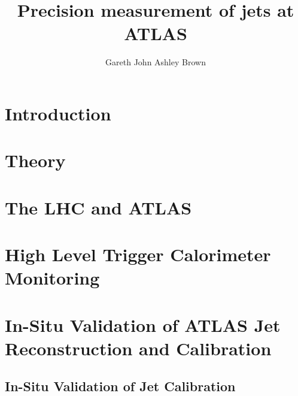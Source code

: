\documentclass[12pt,PhD]{Thesis}
\begin{document}
\title{Precision measurement of jets at ATLAS}
    \author{Gareth John Ashley Brown}

\beforeabstract
{}
    
\afterabstract
    
\afterpreface

\chapter{Introduction}


\chapter{Theory}
\label{chp:Theory}








\chapter{The LHC and ATLAS}
\label{chp:LHC_ATLAS}








 
 

\chapter{High Level Trigger Calorimeter Monitoring}
\label{chp:HLTCalo}


\chapter{In-Situ Validation of ATLAS Jet Reconstruction and Calibration}
\label{chp:JetPerf}

\section{In-Situ Validation of Jet Calibration}



\end{document}
